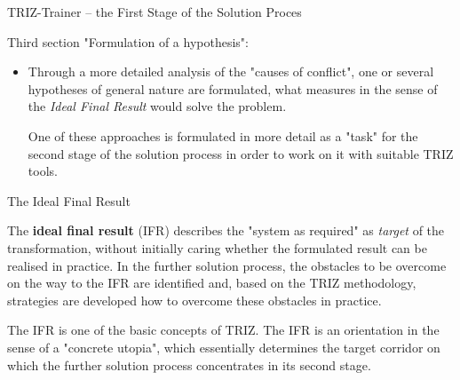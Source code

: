 \documentclass{beamer}
\begin{document}
\begin{frame}{TRIZ-Trainer -- the First Stage of the Solution Proces}
  
Third section "Formulation of a hypothesis": 
\begin{itemize}
\item Through a more detailed analysis of the "causes of conflict", one or
  several hypotheses of general nature are formulated, what measures in the
  sense of the \emph{Ideal Final Result} would solve the problem.
  
  One of these approaches is formulated in more detail as a "task" for the
  second stage of the solution process in order to work on it with suitable
  TRIZ tools.
\end{itemize}
\end{frame}

\begin{frame}{The Ideal Final Result}
  
The \textbf{ideal final result} (IFR) describes the "system as required" as
\emph{target} of the transformation, without initially caring whether the
formulated result can be realised in practice. In the further solution
process, the obstacles to be overcome on the way to the IFR are identified
and, based on the TRIZ methodology, strategies are developed how to overcome
these obstacles in practice.

The IFR is one of the basic concepts of TRIZ. The IFR is an orientation in the
sense of a "concrete utopia", which essentially determines the target corridor
on which the further solution process concentrates in its second stage.
\end{frame}
\end{document}
